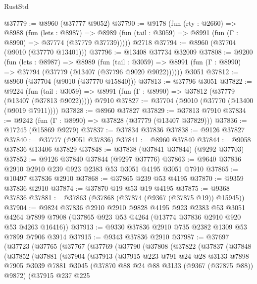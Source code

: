 \begin{lexlean}{RustStd}
\begin{coremodule}
@37779 := @8960 (@37777 @9052)
@37790 := @9178
    (fun (rty : @2660) =>
    @8988
      (fun (lets : @8987) =>
      @8989 (fun (tail : @3059) => @8991 (fun (Γ : @8990) => @37774 (@37779 @37739)))))
    @2718
@37794 := @8960 (@37704 (@9010 (@37770 @13401)))
@37796 := @13408 @37734 @32009
@37808 := @9200
    (fun (lets : @8987) =>
    @8989
      (fun (tail : @3059) =>
      @8991 (fun (Γ : @8990) => @37794 (@37779 (@13407 (@37796 @9020 @9022))))))
    @3051
@37812 := @8960 (@37704 (@9010 (@37770 @15840)))
@37813 := @37796 @3051
@37822 := @9224
    (fun (tail : @3059) => @8991 (fun (Γ : @8990) => @37812 (@37779 (@13407 (@37813 @9022)))))
    @7910
@37827 := @37704 (@9010 (@37770 (@13400 (@9019 @7911))))
@37828 := @8960 @37827
@37829 := @37813 @7910
@37834 := @9242 (fun (Γ : @8990) => @37828 (@37779 (@13407 @37829)))
@37836 := @17245 (@15869 @9279)
@37837 := @37834 @37836
@37838 := @9126 @37827
@37840 := @37777 (@9051 @37836)
@37841 := @8960 @37840
@37844 := @9058 @37836 @13406 @37829
@37848 := @37838 (@37841 @37844) (@9292 @37703)
@37852 := @9126 @37840 @37844 (@9297 @37776)
@37863 := @9640 @37836 @2910 @2910 @239 @923 @2383 @53 @3051 @4195 @3051 @7910
@37865 := @10497 @37836 @2910
@37868 := @37865 @239 @53 @4195
@37870 := @9359 @37836 @2910
@37874 := @37870 @19 @53 @19 @4195
@37875 := @9368 @37836
@37881 := @37863 (@37868 (@37874 (@9367 (@37875 @19)) @15945))
@37904 := @9824
    @37836
    @2910
    @2910
    @9828
    @4195
    @923
    @2383
    @53
    @3051
    @4264
    @7899
    @7908
    (@37865 @923 @53 @4264 (@13774 @37836 @2910 @920 @53 @4263 @16416))
@37913 := @9330 @37836 @2910 @735 @2382 @1309 @53 @7899 @7906 @3914
@37915 := @9343 @37836 @2910
@37987 := @37697
    (@37723
      (@37765
        (@37767
          (@37769
            (@37790
              (@37808
                (@37822
                  (@37837
                    (@37848
                      (@37852
                        (@37881
                          (@37904
                            (@37913
                              (@37915
                                @223
                                @791
                                @24
                                @28
                                @3133
                                @7898
                                @7905
                                @3039
                                @7881
                                @3045
                                (@37870 @88 @24 @88 @3133 (@9367 (@37875 @88)) @9872)
                                (@37915
                                  @237
                                  @225

\end{coremodule}
\end{lexlean}
